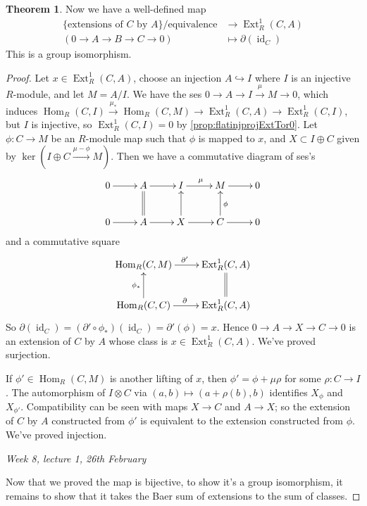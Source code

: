 \documentclass{article}
\newcommand{\id}{\operatorname{id}}
\newcommand{\Hom}{\operatorname{Hom}}
\newcommand{\Ext}{\operatorname{Ext}}
\theoremstyle{definition}
\newtheorem{thm}[defn]{Theorem}
\begin{document}
\begin{thm}
Now we have a well-defined map
\[
\begin{aligned}
\{\text{extensions of }C\text{ by }A\}/\text{equivalence}&\rightarrow\Ext_R^1(C,A) \\
(0\rightarrow A\rightarrow B\rightarrow C\rightarrow 0)&\mapsto\partial(\id_C)
\end{aligned}
\]
This is a group isomorphism.
\end{thm}
\begin{proof}
Let $x\in\Ext_R^1(C,A)$, choose an injection $A\hookrightarrow I$ where $I$ is an injective $R$-module, and let $M=A/I$. We have the ses $0\rightarrow A\rightarrow I\xrightarrow{\mu}M\rightarrow 0$, which induces $\Hom_R(C,I)\xrightarrow{\mu_\ast}\Hom_R(C,M)\rightarrow\Ext_R^1(C,A)\rightarrow\Ext_R^1(C,I)$, but $I$ is injective, so $\Ext_R^1(C,I)=0$ by \ref{prop:flatinjprojExtTor0}. Let $\phi:C\rightarrow M$ be an $R$-module map such that $\phi$ is mapped to $x$, and $X\subset I\oplus C$ given by $\ker(I\oplus C\xrightarrow{\mu-\phi}M)$. Then we have a commutative diagram of ses's
\[
\xymatrix{
0\ar[r]& A\ar[r]& I\ar[r]^\mu & M\ar[r]& 0 \\
0\ar[r]& A\ar[r]\ar@{=}[u] & X\ar[r]\ar[u] & C\ar[r]\ar[u]_\phi & 0
}
\]
and a commutative square
\[
\xymatrix{
\Hom_R(C,M)\ar[r]^{\partial'} & \Ext_R^1(C,A) \\
\Hom_R(C,C)\ar[r]^\partial \ar[u]^{\phi_\ast} & \Ext_R^1(C,A)\ar@{=}[u]
}
\]
So $\partial(\id_C)=(\partial'\circ\phi_\ast)(\id_C)=\partial'(\phi)=x$. Hence $0\rightarrow A\rightarrow X\rightarrow C\rightarrow 0$ is an extension of $C$ by $A$ whose class is $x\in\Ext_R^1(C,A)$. We've proved surjection.

If $\phi'\in\Hom_R(C,M)$ is another lifting of $x$, then $\phi'=\phi+\mu\rho$ for some $\rho:C\rightarrow I$. The automorphism of $I\otimes C$ via $(a,b)\mapsto (a+\rho(b),b)$ identifies $X_\phi$ and $X_{\phi'}$. Compatibility can be seen with maps $X\rightarrow C$ and $A\rightarrow X$; so the extension of $C$ by $A$ constructed from $\phi'$ is equivalent to the extension constructed from $\phi$. We've proved injection.

\begin{flushright}
\textit{Week 8, lecture 1, 26th February}
\end{flushright}

Now that we proved the map is bijective, to show it's a group isomorphism, it remains to show that it takes the Baer sum of extensions to the sum of classes.


\end{proof}
\end{document}
